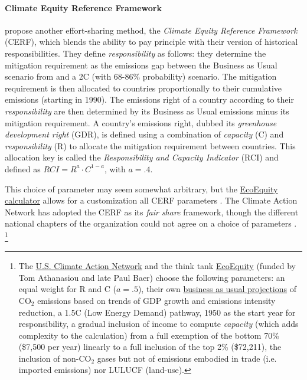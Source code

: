 \documentclass[12pt,english]{article}
\begin{document}
\paragraph{Climate Equity Reference Framework} \citet{baer_greenhouse_2008} %
propose another effort-sharing method, %
the \textit{Climate Equity Reference Framework} (CERF), which blends the ability to pay principle with their version of historical responsibilities. They define \textit{responsibility} as follows: they determine the mitigation requirement as the emissions gap between the Business as Usual scenario from \citet{iea_world_2007} and a 2\textdegree{}C (with 68-86\% probability) scenario. The mitigation requirement is then allocated to countries proportionally to their cumulative emissions (starting in 1990). The emissions right of a country according to their \textit{responsibility} are then determined by its Business as Usual emissions minus its mitigation requirement. A country's emissions right, dubbed its \textit{greenhouse development right} (GDR), 
is defined using a combination of \textit{capacity} (C) and \textit{responsibility} (R) to allocate the mitigation requirement between countries. This allocation key is called the \textit{Responsibility and Capacity Indicator} (RCI) and defined as $RCI = R^{a}\cdot C^{1-a}$, with $a=.4$. %

This choice of parameter may seem somewhat arbitrary, but the \href{https://climateequityreference.org}{EcoEquity calculator} allows for a customization all CERF %
parameters \citep{holz_climate_2019}. The Climate Action Network has adopted the CERF %
as its \textit{fair share} framework, though the different national chapters of the organization could not agree on a choice of parameters \citep{athanasiou_fair_2022}.%
\footnote{The \href{https://usfairshare.org/}{U.S. Climate Action Network} and the think tank \href{https://www.ecoequity.org/about/}{EcoEquity} (funded by Tom Athanasiou and late Paul Baer) choose the following parameters: an equal weight for R and C ($a=.5$), their own \href{https://climateequityreference.org/calculator-information/gdp-and-emissions-baselines/}{business as usual projections} of CO$_\text{2}$ emissions based on trends of GDP growth and emissions intensity reduction,  %
a 1.5\textdegree{}C (Low Energy Demand) pathway, 1950 as the start year for responsibility, a gradual inclusion of income to compute \textit{capacity} (which adds complexity to the calculation) from a full exemption of the bottom 70\% (\$7,500 per year) linearly to a full inclusion of the top 2\% (\$72,211), the inclusion of non-CO$_\text{2}$ gases but not of emissions embodied in trade (i.e. imported emissions) nor LULUCF (land-use). }
\end{document}
